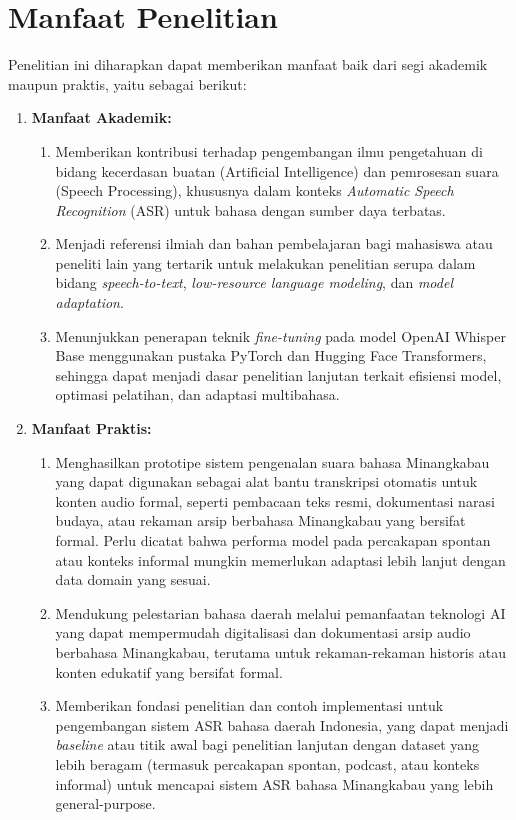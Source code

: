 \section{Manfaat Penelitian} \label{I.Manfaat}
Penelitian ini diharapkan dapat memberikan manfaat baik dari segi akademik maupun praktis, yaitu sebagai berikut:

\begin{enumerate}
    \item \textbf{Manfaat Akademik:}
    \begin{enumerate}
        \item Memberikan kontribusi terhadap pengembangan ilmu pengetahuan di bidang kecerdasan buatan (Artificial Intelligence) dan pemrosesan suara (Speech Processing), khususnya dalam konteks \textit{Automatic Speech Recognition} (ASR) untuk bahasa dengan sumber daya terbatas.
        \item Menjadi referensi ilmiah dan bahan pembelajaran bagi mahasiswa atau peneliti lain yang tertarik untuk melakukan penelitian serupa dalam bidang \textit{speech-to-text}, \textit{low-resource language modeling}, dan \textit{model adaptation}.
        \item Menunjukkan penerapan teknik \textit{fine-tuning} pada model OpenAI Whisper Base menggunakan pustaka PyTorch dan Hugging Face Transformers, sehingga dapat menjadi dasar penelitian lanjutan terkait efisiensi model, optimasi pelatihan, dan adaptasi multibahasa.
    \end{enumerate}

    \item \textbf{Manfaat Praktis:}
    \begin{enumerate}
        \item Menghasilkan prototipe sistem pengenalan suara bahasa Minangkabau yang dapat digunakan sebagai alat bantu transkripsi otomatis untuk konten audio formal, seperti pembacaan teks resmi, dokumentasi narasi budaya, atau rekaman arsip berbahasa Minangkabau yang bersifat formal. Perlu dicatat bahwa performa model pada percakapan spontan atau konteks informal mungkin memerlukan adaptasi lebih lanjut dengan data domain yang sesuai.
        \item Mendukung pelestarian bahasa daerah melalui pemanfaatan teknologi AI yang dapat mempermudah digitalisasi dan dokumentasi arsip audio berbahasa Minangkabau, terutama untuk rekaman-rekaman historis atau konten edukatif yang bersifat formal.
        \item Memberikan fondasi penelitian dan contoh implementasi untuk pengembangan sistem ASR bahasa daerah Indonesia, yang dapat menjadi \textit{baseline} atau titik awal bagi penelitian lanjutan dengan dataset yang lebih beragam (termasuk percakapan spontan, podcast, atau konteks informal) untuk mencapai sistem ASR bahasa Minangkabau yang lebih general-purpose.
    \end{enumerate}
\end{enumerate}


